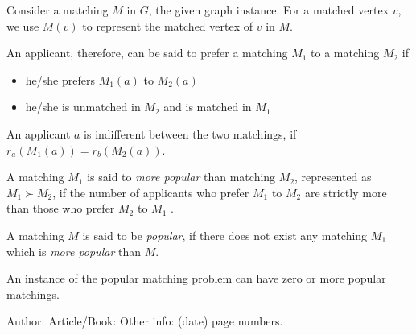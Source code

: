 \documentclass{llncs}
\begin{document}
Consider a matching $M$ in $G$, the given graph instance. For a matched vertex $v$, we use $M(v)$ to represent the matched vertex of $v$ in $M$. 

An applicant, therefore, can be said to prefer a matching $M_1$ to a matching $M_2$ if 
\begin{itemize}
\item he/she prefers $M_1(a)$ to  $M_2(a)$
\item he/she is unmatched in $M_2$ and is matched in $M_1$
\end{itemize}

An applicant $a$ is indifferent between the two matchings, if  $r_a(M_1(a)) = r_b(M_2(a))$.

A matching $M_1$ is said to \emph{more popular} than matching $M_2$, represented as $M_1 \succ M_2$, if the number of applicants who prefer $M_1$ to $M_2$ are strictly more than those who prefer $M_2$ to $M_1$ .  


A matching $M$ is said to be \emph{popular}, if there does not exist any matching $M_1$ which is \emph{more popular} than $M$.  

An instance of the popular matching problem can have zero or more popular matchings. 































%
%

\begin{thebibliography}{1}
Author:
Article/Book:
Other info: (date) page numbers.
\end{thebibliography}
\end{document}
